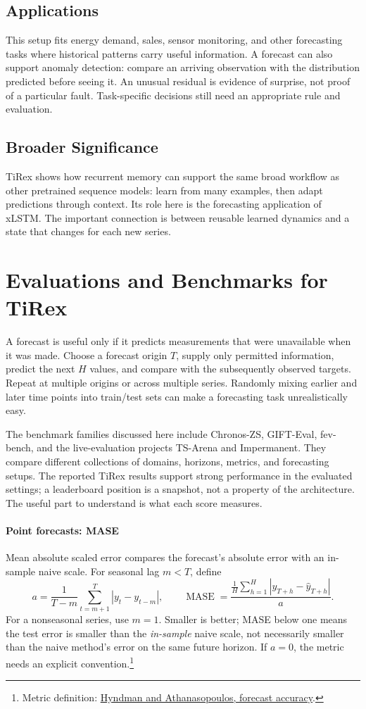 \documentclass[11pt, oneside]{book}
\let\originalsection\section
\renewcommand{\section}{\Needspace{7\baselineskip}\originalsection}
\let\originalsubsection\subsection
\renewcommand{\subsection}{\Needspace{6\baselineskip}\originalsubsection}
\begin{document}
\subsection{Applications}\label{sec:source-9-1-8}
This setup fits energy demand, sales, sensor monitoring, and other forecasting tasks where historical patterns carry useful information. A forecast can also support anomaly detection: compare an arriving observation with the distribution predicted before seeing it. An unusual residual is evidence of surprise, not proof of a particular fault. Task-specific decisions still need an appropriate rule and evaluation.

\subsection{Broader Significance}\label{sec:source-9-1-9}
TiRex shows how recurrent memory can support the same broad workflow as other pretrained sequence models: learn from many examples, then adapt predictions through context. Its role here is the forecasting application of xLSTM. The important connection is between reusable learned dynamics and a state that changes for each new series.

\section{Evaluations and Benchmarks for TiRex}\label{sec:source-9-2}
A forecast is useful only if it predicts measurements that were unavailable when it was made. Choose a forecast origin $T$, supply only permitted information, predict the next $H$ values, and compare with the subsequently observed targets. Repeat at multiple origins or across multiple series. Randomly mixing earlier and later time points into train/test sets can make a forecasting task unrealistically easy.

The benchmark families discussed here include Chronos-ZS, GIFT-Eval, fev-bench, and the live-evaluation projects TS-Arena and Impermanent. They compare different collections of domains, horizons, metrics, and forecasting setups. The reported TiRex results support strong performance in the evaluated settings; a leaderboard position is a snapshot, not a property of the architecture. The useful part to understand is what each score measures.

\paragraph{Point forecasts: MASE} Mean absolute scaled error compares the forecast's absolute error with an in-sample naive scale. For seasonal lag $m<T$, define
\[
 a=\frac{1}{T-m}\sum_{t=m+1}^T|y_t-y_{t-m}|,\qquad
 \operatorname{MASE}=\frac{\frac1H\sum_{h=1}^H|y_{T+h}-\widehat y_{T+h}|}{a}.
\]
For a nonseasonal series, use $m=1$. Smaller is better; MASE below one means the test error is smaller than the \emph{in-sample} naive scale, not necessarily smaller than the naive method's error on the same future horizon. If $a=0$, the metric needs an explicit convention.\footnote{Metric definition: \href{https://otexts.com/fpp3/accuracy.html}{Hyndman and Athanasopoulos, forecast accuracy}.}
\end{document}

